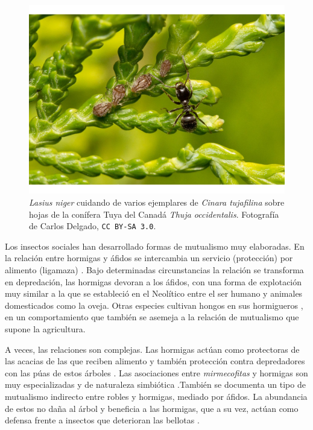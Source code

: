 \begin{figure}[h!]
\centering
\includegraphics[scale=1]{Figures/INTRO_Lasius_niger_y_Cinara_tujafilina_en_Thuja_occidentalis.jpg}
\caption{\textit{Lasius niger} cuidando de varios ejemplares de \textit{Cinara tujafilina} sobre hojas de la conífera Tuya del Canadá \textit{Thuja occidentalis}. Fotografía de Carlos Delgado, \small{\texttt{CC BY-SA 3.0}}.}
\label{fig:INTRO_Lasius_niger_y_Cinara_tujafilina_en_Thuja_occidentalis}
\end{figure}

Los insectos sociales han desarrollado formas de mutualismo muy elaboradas. En la relación entre hormigas y áfidos se intercambia un servicio (protección) por alimento (ligamaza) \cite{volkl1999ant}. Bajo determinadas circunstancias la relación se transforma en depredación, las hormigas devoran a los áfidos, con una forma de explotación muy similar a la que se estableció en el Neolítico entre el ser humano y animales domesticados como la oveja. Otras especies cultivan hongos en sus hormigueros \cite{mueller2001origin}, en un comportamiento que también se asemeja a la relación de mutualismo que supone la agricultura.

A veces, las relaciones son complejas. Las hormigas actúan como protectoras de las acacias de las que reciben alimento y también protección contra depredadores con las púas de estos árboles \cite{raine2002spatial}. Las asociaciones entre \textit{mirmecofitas} y hormigas son muy especializadas y de naturaleza simbiótica \cite{djieto2004symbiotic}.También se documenta un tipo de mutualismo indirecto entre robles y hormigas, mediado por áfidos. La abundancia de estos no daña al árbol y beneficia a las hormigas, que a su vez, actúan como defensa frente a insectos que deterioran las bellotas \cite{ito1991indirect}.


